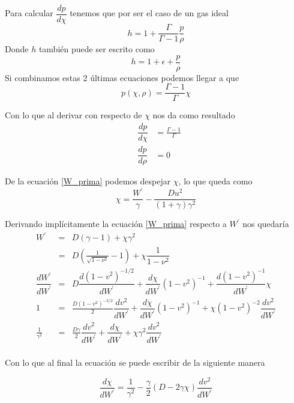 \documentclass[12pt,a4paper]{book}
\begin{document}
Para calcular $\dfrac{dp}{d\chi}$ tenemos que por ser el caso de un gas ideal
\begin{equation} \label{entalpia_funcion_presion_densidad}
h=1+\frac{\Gamma}{\Gamma-1}\frac{p}{\rho}
\end{equation}
Donde $h$ también puede ser escrito como
\begin{equation}
h=1+\epsilon+\frac{p}{\rho}
\end{equation}
Si combinamos estas 2 últimas ecuaciones podemos llegar a que 
\begin{equation}
p(\chi,\rho)=\frac{\Gamma-1}{\Gamma}\chi
\end{equation}

Con lo que al derivar con respecto de $\chi$ nos da como resultado
\begin{eqnarray}\label{der_presion}
& \dfrac{d p}{d \chi}&=\frac{\Gamma-1}{\Gamma}\\ &\dfrac{d p}{d \rho}&= 0
\end{eqnarray}

De la ecuación \ref{W_prima} podemos despejar $\chi$, lo que queda como
\begin{equation}
\chi=\frac{W^{'}}{\gamma}- \frac{D u^{2}}{(1+\gamma)\gamma^{2}}
\end{equation}

Derivando implícitamente la ecuación \ref{W_prima} respecto a $W^{'}$ nos quedaría
\begin{eqnarray*}
W^{'}&=&D\left(\gamma-1 \right) + \chi \gamma^{2}\\%
&=& D\left(\frac{1}{\sqrt{1-\nu^{2}}} -1\right)+\chi \dfrac{1}{1-\nu^{2}} \\%
\dfrac{d W^{'}}{d W^{'}} &=& D \dfrac{d (1-v^2)^{-1/2}}{d W^{'}}+\dfrac{d \chi}{dW^{'}}(1-v^2)^{-1}+\dfrac{d (1-v^2)^{-1} }{d W^{'}}\chi \\  %
1 &=& \frac{D(1-v^2)^{-3/2}}{2} \dfrac{d v^{2}}{d W^{'}}+\dfrac{d \chi}{dW^{'}}(1-v^2)^{-1}+ \chi (1-v^2)^{-2}  \dfrac{d v^{2}}{d W^{'}} \\ %
\frac{1}{\gamma ^2} &=& \frac{D \gamma}{2} \dfrac{d v^{2}}{d W^{'}} + \dfrac{d \chi}{dW^{'}} + \chi \gamma^2 \dfrac{d v^2}{dW^{'}} \\ %
\end{eqnarray*}

Con lo que al final la ecuación se puede escribir de la siguiente manera

\begin{equation}\label{der_chi}
\dfrac{d \chi}{dW^{'}}=\frac{1}{\gamma^2}-\frac{\gamma}{2}(D-2\gamma \chi) \dfrac{d v^2}{dW^{'}}
\end{equation}
\end{document}
